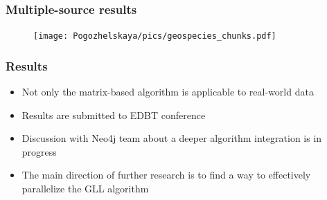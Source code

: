 \documentclass{beamer}
\begin{document}
 \begin{frame}
\transwipe[direction=90]
 \frametitle{Multiple-source results}
 \begin{figure}[H]
\centering
\texttt{[image: Pogozhelskaya/pics/geospecies\_chunks.pdf]}
\label{fig:arch}
\end{figure}
\end{frame}

\begin{frame}
\transwipe[direction=90]
\frametitle{Results}
\begin{itemize}
    \item Not only the matrix-based algorithm is applicable to real-world data
    \item Results are submitted to EDBT conference
    \item Discussion with Neo4j team about a deeper algorithm integration is in progress
    \item The main direction of further research is to find a way to effectively parallelize the GLL algorithm
\end{itemize}
\end{frame}
\end{document}
